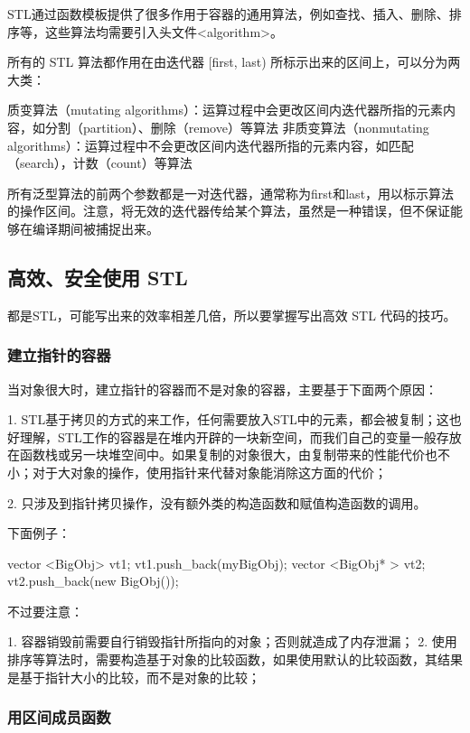STL通过函数模板提供了很多作用于容器的通用算法，例如查找、插入、删除、排序等，这些算法均需要引入头文件<algorithm>。

所有的 STL 算法都作用在由迭代器 [first, last) 所标示出来的区间上，可以分为两大类：

 质变算法（mutating algorithms）：运算过程中会更改区间内迭代器所指的元素内容，如分割（partition）、删除（remove）等算法
 非质变算法（nonmutating algorithms）：运算过程中不会更改区间内迭代器所指的元素内容，如匹配（search），计数（count）等算法

所有泛型算法的前两个参数都是一对迭代器，通常称为first和last，用以标示算法的操作区间。注意，将无效的迭代器传给某个算法，虽然是一种错误，但不保证能够在编译期间被捕捉出来。


\subsection {高效、安全使用 STL}

都是STL，可能写出来的效率相差几倍，所以要掌握写出高效 STL 代码的技巧。

\subsubsection {建立指针的容器}

当对象很大时，建立指针的容器而不是对象的容器，主要基于下面两个原因：

1. STL基于拷贝的方式的来工作，任何需要放入STL中的元素，都会被复制；这也好理解，STL工作的容器是在堆内开辟的一块新空间，而我们自己的变量一般存放在函数栈或另一块堆空间中。如果复制的对象很大，由复制带来的性能代价也不小；对于大对象的操作，使用指针来代替对象能消除这方面的代价；

2. 只涉及到指针拷贝操作，没有额外类的构造函数和赋值构造函数的调用。

下面例子：
\begin{Code}
	vector <BigObj> vt1;
	vt1.push_back(myBigObj);
	vector <BigObj* > vt2;
	vt2.push_back(new BigObj());
\end{Code}


不过要注意：

1. 容器销毁前需要自行销毁指针所指向的对象；否则就造成了内存泄漏；
2. 使用排序等算法时，需要构造基于对象的比较函数，如果使用默认的比较函数，其结果是基于指针大小的比较，而不是对象的比较；

\subsubsection {用区间成员函数}

